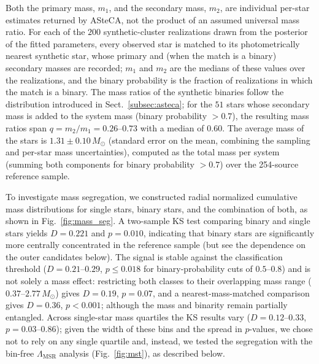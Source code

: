 \documentclass{aa}
\begin{document}
Both the primary mass, $m_1$, and the secondary mass, $m_2$, are individual per-star estimates returned by ASteCA, not the product of an assumed universal mass ratio. For each of the $200$ synthetic-cluster realizations drawn from the posterior of the fitted parameters, every observed star is matched to its photometrically nearest synthetic star, whose primary and (when the match is a binary) secondary masses are recorded; $m_1$ and $m_2$ are the medians of these values over the realizations, and the binary probability is the fraction of realizations in which the match is a binary. The mass ratios of the synthetic binaries follow the \citet{2013ARA&A..51..269D} distribution introduced in Sect.~\ref{subsec:asteca}; for the $51$ stars whose secondary mass is added to the system mass (binary probability $>0.7$), the resulting mass ratios span $q=m_2/m_1=0.26$--$0.73$ with a median of $0.60$. The average mass of the stars is $1.31 \pm 0.10\,M_\odot$ (standard error on the mean, combining the sampling and per-star mass uncertainties), computed as the total mass per system (summing both components for binary probability $>0.7$) over the 254-source reference sample.

To investigate mass segregation, we constructed radial normalized cumulative mass distributions for single stars, binary stars, and the combination of both, as shown in Fig.~\ref{fig:mass_seg}. A two-sample KS test comparing binary and single stars yields $D=0.221$ and $p=0.010$, indicating that binary stars are significantly more centrally concentrated in the reference sample (but see the dependence on the outer candidates below). The signal is stable against the classification threshold ($D=0.21$--$0.29$, $p\leq0.018$ for binary-probability cuts of $0.5$--$0.8$) and is not solely a mass effect: restricting both classes to their overlapping mass range ($0.37$--$2.77\,M_\odot$) gives $D=0.19$, $p=0.07$, and a nearest-mass-matched comparison gives $D=0.36$, $p<0.001$; although the mass and binarity remain partially entangled. Across single-star mass quartiles the KS results vary ($D=0.12$--$0.33$, $p=0.03$--$0.86$); given the width of these bins and the spread in $p$-values, we chose not to rely on any single quartile and, instead, we tested the segregation with the bin-free $\Lambda_{\mathrm{MSR}}$ analysis (Fig.~\ref{fig:mst}), as described below.
\end{document}
